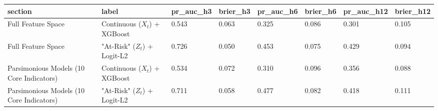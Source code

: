 \begin{tabular}{llllllll}
\toprule
section & label & pr_auc_h3 & brier_h3 & pr_auc_h6 & brier_h6 & pr_auc_h12 & brier_h12 \\
\midrule
Full Feature Space & Continuous ($X_t$) + XGBoost & 0.543 & 0.063 & 0.325 & 0.086 & 0.301 & 0.105 \\
Full Feature Space & "At-Risk" ($Z_t$) + Logit-L2 & 0.726 & 0.050 & 0.453 & 0.075 & 0.429 & 0.094 \\
Parsimonious Models (10 Core Indicators) & Continuous ($X_t$) + XGBoost & 0.534 & 0.072 & 0.310 & 0.096 & 0.356 & 0.088 \\
Parsimonious Models (10 Core Indicators) & "At-Risk" ($Z_t$) + Logit-L2 & 0.711 & 0.058 & 0.477 & 0.082 & 0.418 & 0.111 \\
\bottomrule
\end{tabular}

